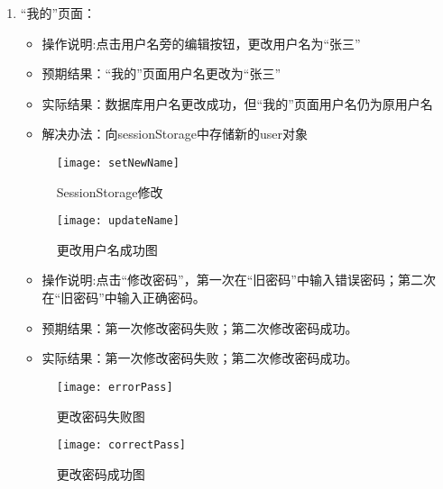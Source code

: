 \begin{enumerate}
    \item {“我的”页面}：
          \begin{itemize}
              \item{操作说明}:点击用户名旁的编辑按钮，更改用户名为“张三”
              \item {预期结果}：“我的”页面用户名更改为“张三”
              \item {实际结果}：数据库用户名更改成功，但“我的”页面用户名仍为原用户名
              \item {解决办法}：向sessionStorage中存储新的user对象
          \end{itemize}
          \begin{figure}[htbp]
            \centering
            \begin{minipage}{0.4\textwidth}
                \centering
                \texttt{[image: setNewName]}
                \caption{SessionStorage修改}\label{fig:setNewName}
            \end{minipage}
            \begin{minipage}{0.4\textwidth}
                \centering
                \texttt{[image: updateName]}
                \caption{更改用户名成功图}\label{fig:updateName}
            \end{minipage}
        \end{figure}
          \begin{itemize}
              \item{操作说明}:点击“修改密码”，第一次在“旧密码”中输入错误密码；第二次在“旧密码”中输入正确密码。
              \item {预期结果}：第一次修改密码失败；第二次修改密码成功。
              \item {实际结果}：第一次修改密码失败；第二次修改密码成功。
          \end{itemize}
          \begin{figure}[htbp]
              \centering
              \begin{minipage}{0.4\textwidth}
                  \centering
                  \texttt{[image: errorPass]}
                  \caption{更改密码失败图}\label{fig:errorPass}
              \end{minipage}
              \begin{minipage}{0.4\textwidth}
                  \centering
                  \texttt{[image: correctPass]}
                  \caption{更改密码成功图}\label{fig:correctPass}
              \end{minipage}

\end{figure}
\end{enumerate}
